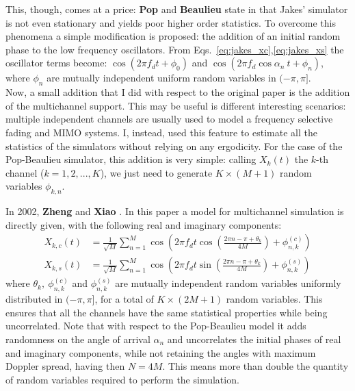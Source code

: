 This, though, comes at a price: \textbf{Pop} and \textbf{Beaulieu} state in \cite{A1} that Jakes' simulator is not even stationary and yields poor higher order statistics. To overcome this phenomena a simple modification is proposed: the addition of an initial random phase to the low frequency oscillators. From Eqs.~\ref{eq:jakes_xc},\ref{eq:jakes_xs} the oscillator terms become: $\cos(2\pi f_d t + \phi_0)$ and $\cos( 2\pi f_d \cos \alpha_n \ t + \phi_n)$, where $\phi_n$ are mutually independent uniform random variables in $(-\pi,\pi]$.\\
Now, a small addition that I did with respect to the original paper is the addition of the multichannel support. This may be useful is different interesting scenarios: multiple independent channels are usually used to model a frequency selective fading and MIMO systems. I, instead, used this feature to estimate all the statistics of the simulators without relying on any ergodicity. For the case of the Pop-Beaulieu simulator, this addition is very simple: calling $X_k(t)$ the $k$-th channel ($k=1,2,...,K$), we just need to generate $K \times(M+1)$ random variables $\phi_{k,n}$.

In 2002, \textbf{Zheng} and \textbf{Xiao} \cite{C2}. In this paper a model for multichannel simulation is directly given, with the following real and imaginary components:%
%
\begin{subequations}
\begin{align}
X_{k,c}(t) &= \frac{1}{\sqrt{M}} \sum_{n=1}^{M} \cos \left( 2\pi f_d t \cos \left( \frac{2\pi n - \pi + \theta_k}{4M}\right) + \phi_{n,k}^{(c)} \right)\\
X_{k,s}(t) &= \frac{1}{\sqrt{M}} \sum_{n=1}^{M} \cos \left( 2\pi f_d t \sin \left( \frac{2\pi n - \pi + \theta_k}{4M}\right) + \phi_{n,k}^{(s)} \right)
\end{align}
\end{subequations}%
%
where $\theta_k, \ \phi_{n,k}^{(c)}$ and $\phi_{n,k}^{(s)}$ are mutually independent random variables uniformly distributed in $(-\pi,\pi]$, for a total of $K \times (2M+1)$ random variables. This ensures that all the channels have the same statistical properties while being uncorrelated. Note that with respect to the Pop-Beaulieu model it adds randomness on the angle of arrival $\alpha_n$ and uncorrelates the initial phases of real and imaginary components, while not retaining the angles with maximum Doppler spread, having then $N=4M$. This means more than double the quantity of random variables required to perform the simulation.

